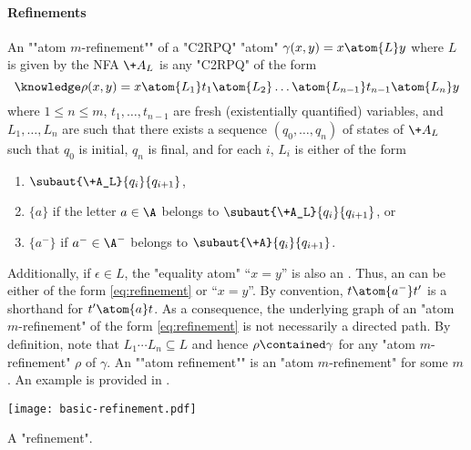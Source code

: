 \paragraph*{Refinements}
\AP An ""atom $m$-refinement"" of a "C2RPQ" "atom" $\gamma(x,y) = x \atom{L} y$ where $L$ is given by the NFA $\+A_L$ is any "C2RPQ" of the form 
\begin{equation}
    \AP\label{eq:refinement}
    \rho(x,y) = x \atom{L_1} t_1 \atom{L_2} \hdots \atom{L_{n-1}} t_{n-1} \atom{L_n} y
\end{equation}
where $1 \leq n \leq m$, $t_1,\hdots,t_{n-1}$ are fresh (existentially quantified) variables,
and $L_1,\hdots,L_n$ are such that there exists a sequence $(q_0,\dotsc,q_n)$ of states of $\+A_L$
such that $q_0$ is initial, $q_n$ is final, and for each $i$, $L_i$ is either of the form
\begin{enumerate}[label=\roman*.]
	\item $\subaut{\+A_L}{q_i}{q_{i+1}}$,
	\item $\{a\}$ if the letter $a\in \A$ belongs to $\subaut{\+A_L}{q_i}{q_{i+1}}$, or 
	\item $\{a^{-}\}$ if $a^{-} \in \A^{-}$ belongs to $\subaut{\+A}{q_i}{q_{i+1}}$.
\end{enumerate}
Additionally, if $\epsilon \in L$, the "equality atom" ``$x = y$'' is also an . Thus, an  can be either of the form \eqref{eq:refinement} or ``$x=y$''.
By convention, $t \atom{a^{-}} t'$ is a shorthand for $t' \atom{a} t$. As a consequence,
the underlying graph of an "atom $m$-refinement" of the form \eqref{eq:refinement} is not necessarily a directed path.
By definition, note that
$L_1\cdots L_n \subseteq L$ and hence $\rho \contained \gamma$ for any "atom $m$-refinement" $\rho$ of $\gamma$.
An \AP""atom refinement"" is an "atom $m$-refinement" for some $m$.
An example is provided in .

\begin{marginfigure}
	\centering
	\texttt{[image: basic-refinement.pdf]}
	\caption{\AP\label{fig:basic-refinement}A "refinement".}
\end{marginfigure}
	
